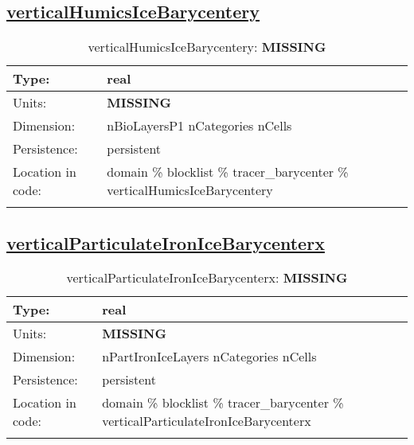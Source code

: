 \subsection[verticalHumicsIceBarycentery]{\hyperref[sec:var_tab_tracer_barycenter]{verticalHumicsIceBarycentery}}
\label{subsec:var_sec_tracer_barycenter_verticalHumicsIceBarycentery}
\begin{center}
\begin{longtable}{| p{2.0in} | p{4.0in} |}
        \hline 
        Type: & real \\
        \hline 
        Units: & {\bf \color{red} MISSING} \\
        \hline 
        Dimension: & nBioLayersP1 nCategories nCells \\
        \hline 
        Persistence: & persistent \\
        \hline 
         Location in code: & domain \% blocklist \% tracer\_barycenter \% verticalHumicsIceBarycentery \\
         \hline 
    \caption{verticalHumicsIceBarycentery: {\bf \color{red} MISSING}}
\end{longtable}
\end{center}
\subsection[verticalParticulateIronIceBarycenterx]{\hyperref[sec:var_tab_tracer_barycenter]{verticalParticulateIronIceBarycenterx}}
\label{subsec:var_sec_tracer_barycenter_verticalParticulateIronIceBarycenterx}
\begin{center}
\begin{longtable}{| p{2.0in} | p{4.0in} |}
        \hline 
        Type: & real \\
        \hline 
        Units: & {\bf \color{red} MISSING} \\
        \hline 
        Dimension: & nPartIronIceLayers nCategories nCells \\
        \hline 
        Persistence: & persistent \\
        \hline 
         Location in code: & domain \% blocklist \% tracer\_barycenter \% verticalParticulateIronIceBarycenterx \\
         \hline 
    \caption{verticalParticulateIronIceBarycenterx: {\bf \color{red} MISSING}}
\end{longtable}
\end{center}
